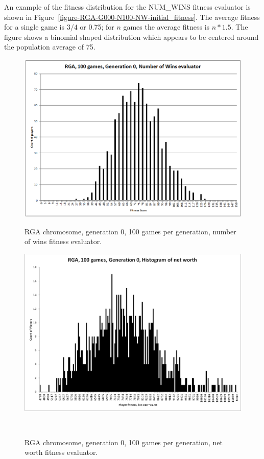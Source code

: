 An example of the fitness distribution for the NUM\_WINS fitness evaluator is
shown in Figure~\ref{figure-RGA-G000-N100-NW-initial_fitness}. The average
fitness for a single game is \(3/4\) or 0.75; for \(n\) games the average
fitness is \(n * 1.5\). The figure shows a binomial shaped distribution which
appears to be centered around the population average of 75.

\begin{figure}
\centering
\begin{minipage}[t]{0.47\linewidth}
\centering
\includegraphics[width=1.0\linewidth]{Figures/RGA_1024_G000_N100_NW.png}
\caption[RGA Num Wins Fitness Distribution, Initial Generation]{RGA chromosome,
generation 0, 100 games per generation, number of wins fitness evaluator.}
\label{figure-RGA-G000-N100-NW-initial_fitness}
\end{minipage}%
\hspace{0.06\linewidth}%
\begin{minipage}[t]{0.47\linewidth}
\centering
\includegraphics[width=1.0\linewidth]{Figures/RGA_1024_G000_N100_NetW.png}
\caption[Historgram of RGA Net Worth Fitness Distribution, Initial
Generation]{RGA chromosome, generation 0, 100 games per generation, net worth fitness evaluator.}
\label{figure-RGA-G000-N100-NetW-initial_fitness}
\end{minipage}
\\[\intextsep]


\end{figure}
